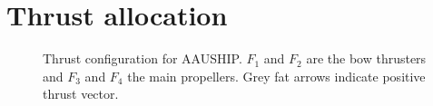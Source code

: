 \section{Thrust allocation}

\begin{figure}[htbp]
	\centering
	
	\caption{Thrust configuration for AAUSHIP. $F_1$ and $F_2$ are the
	bow thrusters and $F_3$ and $F_4$ the main propellers. Grey fat
arrows indicate positive thrust vector.} 
	\label{fig:thrust_allocation}
\end{figure}

